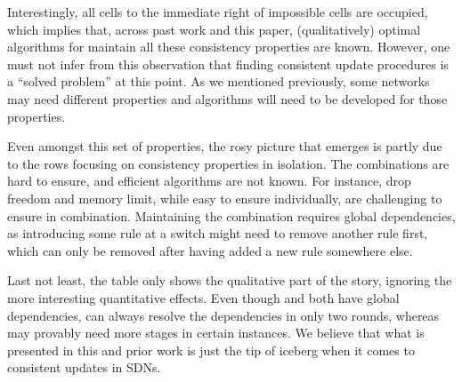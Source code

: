 Interestingly, all cells to the immediate right of impossible cells are occupied, which implies that, across past work and this paper,  (qualitatively) optimal algorithms for maintain all these consistency properties are known. However, one must not infer from this observation that finding consistent update procedures is a ``solved problem'' at this point.  As we mentioned previously, some networks may need different properties and algorithms will need to be developed for those properties.

Even amongst this set of properties, the rosy picture that emerges is partly due to the rows focusing on consistency properties in isolation. The combinations are hard to  ensure, and efficient algorithms are not known. For instance, drop freedom and memory limit, while easy to ensure individually, are challenging to ensure in combination. Maintaining the combination requires global dependencies, as introducing some rule at a switch might need to remove another rule first, which can only be removed after having added a new rule somewhere else.

Last not least, the table only shows the qualitative part of the story, ignoring the more interesting quantitative effects. Even though \cite{safeupdate} and \cite{swan} both have global dependencies, \cite{safeupdate} can always resolve the dependencies in only two rounds, whereas \cite{swan} may provably need more stages in certain instances. We believe that what is presented in this and prior work is just the tip of iceberg when it comes to consistent updates in SDNs.
